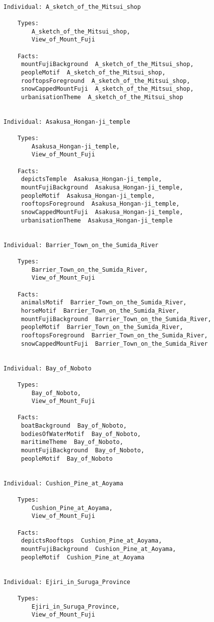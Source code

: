 \documentclass[titlepage,a4paper,12pt,oneside]{book}
\begin{document}
\begin{appendices}
\begin{lstlisting}
    
Individual: A_sketch_of_the_Mitsui_shop

    Types: 
        A_sketch_of_the_Mitsui_shop,
        View_of_Mount_Fuji
    
    Facts:  
     mountFujiBackground  A_sketch_of_the_Mitsui_shop,
     peopleMotif  A_sketch_of_the_Mitsui_shop,
     rooftopsForeground  A_sketch_of_the_Mitsui_shop,
     snowCappedMountFuji  A_sketch_of_the_Mitsui_shop,
     urbanisationTheme  A_sketch_of_the_Mitsui_shop
    
    
Individual: Asakusa_Hongan-ji_temple

    Types: 
        Asakusa_Hongan-ji_temple,
        View_of_Mount_Fuji
    
    Facts:  
     depictsTemple  Asakusa_Hongan-ji_temple,
     mountFujiBackground  Asakusa_Hongan-ji_temple,
     peopleMotif  Asakusa_Hongan-ji_temple,
     rooftopsForeground  Asakusa_Hongan-ji_temple,
     snowCappedMountFuji  Asakusa_Hongan-ji_temple,
     urbanisationTheme  Asakusa_Hongan-ji_temple
    
    
Individual: Barrier_Town_on_the_Sumida_River

    Types: 
        Barrier_Town_on_the_Sumida_River,
        View_of_Mount_Fuji
    
    Facts:  
     animalsMotif  Barrier_Town_on_the_Sumida_River,
     horseMotif  Barrier_Town_on_the_Sumida_River,
     mountFujiBackground  Barrier_Town_on_the_Sumida_River,
     peopleMotif  Barrier_Town_on_the_Sumida_River,
     rooftopsForeground  Barrier_Town_on_the_Sumida_River,
     snowCappedMountFuji  Barrier_Town_on_the_Sumida_River
    
    
Individual: Bay_of_Noboto

    Types: 
        Bay_of_Noboto,
        View_of_Mount_Fuji
    
    Facts:  
     boatBackground  Bay_of_Noboto,
     bodiesOfWaterMotif  Bay_of_Noboto,
     maritimeTheme  Bay_of_Noboto,
     mountFujiBackground  Bay_of_Noboto,
     peopleMotif  Bay_of_Noboto
    
    
Individual: Cushion_Pine_at_Aoyama

    Types: 
        Cushion_Pine_at_Aoyama,
        View_of_Mount_Fuji
    
    Facts:  
     depictsRooftops  Cushion_Pine_at_Aoyama,
     mountFujiBackground  Cushion_Pine_at_Aoyama,
     peopleMotif  Cushion_Pine_at_Aoyama
    
    
Individual: Ejiri_in_Suruga_Province

    Types: 
        Ejiri_in_Suruga_Province,
        View_of_Mount_Fuji
    

\end{lstlisting}
\end{appendices}
\end{document}

